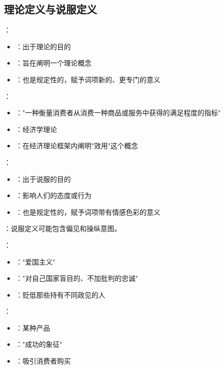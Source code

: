 \subsection{理论定义与说服定义}

\begin{theorembox}[title=理论定义]
：
\begin{itemize}
  \item {}：出于理论的目的
  \item {}：旨在阐明一个理论概念
  \item {}：也是规定性的，赋予词项新的、更专门的意义
\end{itemize}
\end{theorembox}

\begin{examplebox}[title=经济学中的理论定义]
：
\begin{itemize}
  \item {}："一种衡量消费者从消费一种商品或服务中获得的满足程度的指标"
  \item {}：经济学理论
  \item {}：在经济理论框架内阐明"效用"这个概念
\end{itemize}
\end{examplebox}

\begin{theorembox}[title=说服定义]
：
\begin{itemize}
  \item {}：出于说服的目的
  \item {}：影响人们的态度或行为
  \item {}：也是规定性的，赋予词项带有情感色彩的意义
\end{itemize}

：说服定义可能包含偏见和操纵意图。
\end{theorembox}

\begin{examplebox}[title=说服定义的典型例子]
：
\begin{itemize}
  \item {}："爱国主义"
  \item {}："对自己国家盲目的、不加批判的忠诚"
  \item {}：贬低那些持有不同政见的人
\end{itemize}

：
\begin{itemize}
  \item {}：某种产品
  \item {}："成功的象征"
  \item {}：吸引消费者购买
\end{itemize}
\end{examplebox}

